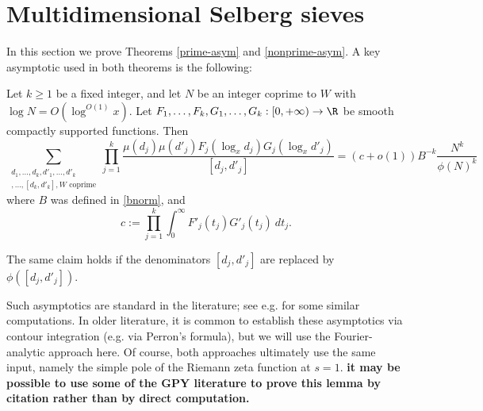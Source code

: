 
\section{Multidimensional Selberg sieves}\label{sieving-sec}

In this section we prove Theorems \ref{prime-asym} and \ref{nonprime-asym}.  A key asymptotic used in both theorems is the following:

\begin{lemma}[Asymptotic]\label{mul-asym}  Let $k \geq 1$ be a fixed integer,
 and let $N$ be an integer coprime to $W$ with $\log{N}=O(\log^{O(1)}{x})$. Let $F_1,\dots,F_k,G_1,\dots,G_k: [0,+\infty)\to \R$ be smooth compactly supported functions.  Then
\begin{equation}\label{multisum}
 \sum_{\substack{d_1,\dots,d_k,d'_1,\dots,d'_k \\ [d_1,d'_1],\dots,[d_k,d'_k], W \text{ coprime}}} \prod_{j=1}^k \frac{\mu(d_j) \mu(d'_j) F_j( \log_x d_j ) G_j( \log_x d'_j)}{[d_j,d'_j]} = (c+o(1)) B^{-k}\frac{N^k}{\phi(N)^k}
\end{equation}
where $B$ was defined in \eqref{bnorm}, and
$$ c := \prod_{j=1}^k \int_0^\infty F'_j(t_j) G'_j(t_j)\ dt_j.$$

The same claim holds if the denominators $[d_j,d'_j]$ are replaced by $\phi([d_j,d'_j])$.
\end{lemma}

Such asymptotics are standard in the literature; see e.g. \cite{gy} for some similar computations.  In older literature, it is common to establish these asymptotics via contour integration (e.g. via Perron's formula), but we will use the Fourier-analytic approach here.  Of course, both approaches ultimately use the same input, namely the simple pole of the Riemann zeta function at $s=1$.  {\bf it may be possible to use some of the GPY literature to prove this lemma by citation rather than by direct computation.}

